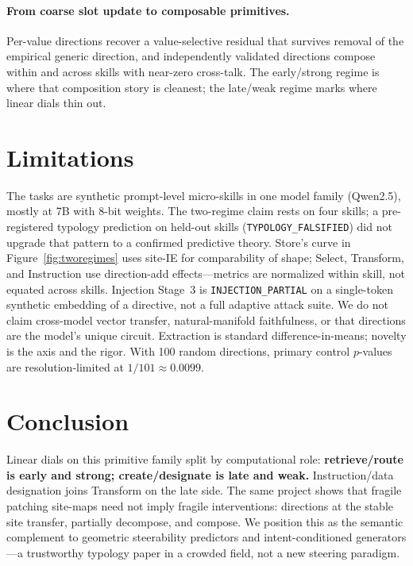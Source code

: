 \documentclass[10pt]{article}
\begin{document}
\paragraph{From coarse slot update to composable primitives.}
Per-value directions recover a value-selective residual that survives removal of
the empirical generic direction, and independently validated directions compose
within and across skills with near-zero cross-talk. The early/strong regime is
where that composition story is cleanest; the late/weak regime marks where
linear dials thin out.

\section{Limitations}

The tasks are synthetic prompt-level micro-skills in one model family
(Qwen2.5), mostly at 7B with 8-bit weights. The two-regime claim rests on four
skills; a pre-registered typology prediction on held-out skills
(\texttt{TYPOLOGY\_FALSIFIED}) did not upgrade that pattern to a confirmed
predictive theory. Store's curve in
Figure~\ref{fig:tworegimes} uses site-IE for comparability of shape; Select,
Transform, and Instruction use direction-add effects---metrics are normalized
within skill, not equated across skills. Injection Stage~3 is
\texttt{INJECTION\_PARTIAL} on a single-token synthetic embedding of a
directive, not a full adaptive attack suite. We do not claim cross-model vector
transfer, natural-manifold faithfulness, or that directions are the model's
unique circuit. Extraction is standard difference-in-means; novelty is the axis
and the rigor. With 100 random directions, primary control $p$-values are
resolution-limited at $1/101\approx0.0099$.

\section{Conclusion}

Linear dials on this primitive family split by computational role:
\textbf{retrieve/route is early and strong; create/designate is late and weak.}
Instruction/data designation joins Transform on the late side. The same project
shows that fragile patching site-maps need not imply fragile interventions:
directions at the stable site transfer, partially decompose, and compose. We
position this as the semantic complement to geometric steerability predictors
and intent-conditioned generators---a trustworthy typology paper in a crowded
field, not a new steering paradigm.



\end{document}
